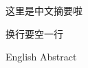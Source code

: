 \begin{cabstract}
  这里是中文摘要啦~

  换行要空一行~
\end{cabstract}


\begin{eabstract}
  English Abstract
\end{eabstract}

